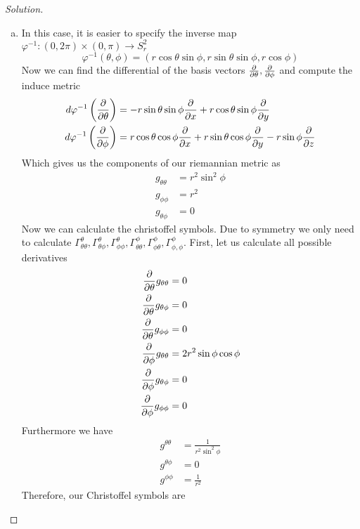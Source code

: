 \documentclass[a4paper]{article}
\begin{document}
\begin{proof}[Solution]
  \begin{enumerate}[(a)]
    \item In this case, it is easier to specify the inverse map $\varphi^{-1}: (0, 2\pi) \times (0, \pi) \rightarrow S_r^2$
      \[
        \varphi^{-1}(\theta, \phi) = (r \cos \theta \sin \phi, r \sin \theta \sin \phi, r \cos \phi)
      \]
  Now we can find the differential of the basis vectors $ \pdv{\theta}, \pdv{\phi}$ and compute the induce metric
  \[
    \begin{aligned}
      d\varphi^{-1} \left( \pdv{\theta} \right) &= -r \sin \theta \sin \phi \pdv{x} + r \cos \theta \sin \phi \pdv{y} \\
      d \varphi^{-1} \left( \pdv{\phi} \right) &= r \cos \theta \cos \phi \pdv{x} + r \sin \theta \cos \phi \pdv{y} - r \sin \phi \pdv{z}
    \end{aligned}
  \]
  Which gives us the components of our riemannian metric as
  \[
    \begin{aligned}
      g_{\theta \theta} &= r^2\sin^2 \phi \\
      g_{\phi \phi} &= r^2  \\
      g_{\theta \phi} &= 0
    \end{aligned}
  \]
  Now we can calculate the christoffel symbols. Due to symmetry we only need to calculate $\Gamma_{\theta \theta}^\theta, \Gamma_{\theta \phi}^\theta, \Gamma_{\phi \phi}^\theta, \Gamma_{\theta \theta}^\phi, \Gamma_{\phi \theta}^{\phi}, \Gamma_{\phi, \phi}^\phi$. First, let us calculate all possible derivatives
  \[
    \begin{aligned}
      \pdv{\theta} g_{\theta \theta} &= 0 \\
      \pdv{\theta} g_{\theta \phi} &= 0 \\
      \pdv{\theta} g_{\phi \phi} &= 0 \\
      \pdv{\phi} g_{\theta \theta} &= 2r^2 \sin \phi \cos \phi \\
      \pdv{\phi} g_{\theta \phi} &= 0 \\
      \pdv{\phi} g_{\phi \phi} &= 0
    \end{aligned}
  \]
  Furthermore we have
  \[
    \begin{aligned}
      g^{\theta \theta} &= \frac{1}{r^2 \sin^2 \phi} \\
      g^{\theta \phi} &= 0 \\
      g^{\phi \phi} &= \frac{1}{r^2}
    \end{aligned}
  \]
  Therefore, our Christoffel symbols are

\end{enumerate}
\end{proof}
\end{document}
